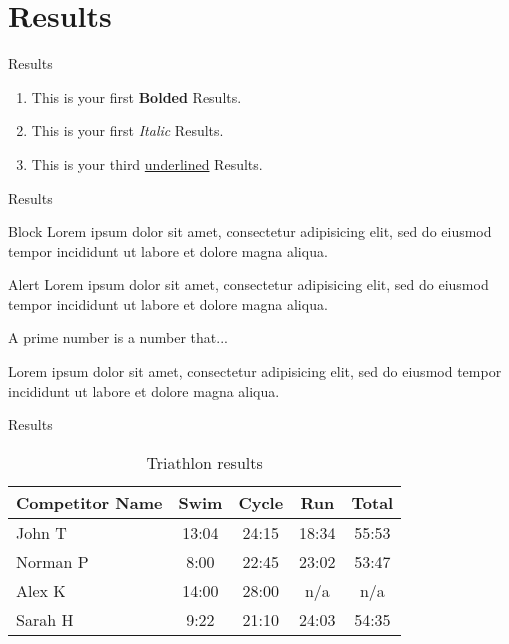 \documentclass[10pt]{beamer}
\begin{document}
\section{Results}
\begin{frame}{Results}
	\begin{enumerate}
	    \item This is your first \textbf{Bolded} Results.  
         \item This is your first \textit{Italic} Results.  
         \item This is your third \underline{underlined} Results.
        
	\end{enumerate}
\end{frame}
\begin{frame}{Results}

\begin{block}{Block }
Lorem ipsum dolor sit amet, consectetur adipisicing elit, 
sed do eiusmod tempor incididunt ut labore et 
dolore magna aliqua.
\end{block}

\begin{alertblock}{Alert}
Lorem ipsum dolor sit amet, consectetur adipisicing elit, 
sed do eiusmod tempor incididunt ut labore et 
dolore magna aliqua.
\end{alertblock}

\begin{definition}
A prime number is a number that...
\end{definition}

\begin{example}
Lorem ipsum dolor sit amet, consectetur adipisicing elit, 
sed do eiusmod tempor incididunt ut labore et
dolore magna aliqua.
\end{example}

\end{frame}

\begin{frame}{Results}
    \begin{table}
        \begin{tabular}{l | c | c | c | c }
        Competitor Name & Swim & Cycle & Run & Total \\
        \hline \hline
        John T & 13:04 & 24:15 & 18:34 & 55:53 \\ 
        Norman P & 8:00 & 22:45 & 23:02 & 53:47\\
        Alex K & 14:00 & 28:00 & n/a & n/a\\
        Sarah H & 9:22 & 21:10 & 24:03 & 54:35 
        \end{tabular}
        \caption{Triathlon results}
    \end{table}
\end{frame}
\end{document}

